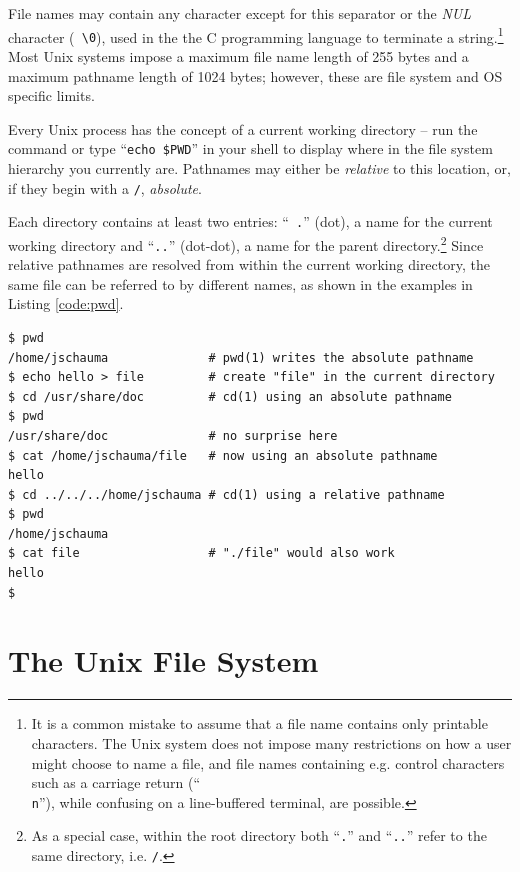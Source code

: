 File names may contain any character except for this
separator or the {\em NUL} character ({\tt
\textbackslash0}), used in the the C programming
language to terminate a string.\footnote{It is a
common mistake to assume that a file name contains
only printable characters.  The Unix system does not
impose many restrictions on how a user might choose
to name a file, and file names containing e.g. control
characters such as a carriage return (``{\tt \\n}''),
while confusing on a line-buffered terminal, are
possible.}  Most Unix systems impose a maximum file
name length of 255 bytes and a maximum pathname length
of 1024 bytes; however, these are file system and OS
specific limits.

Every Unix process has the concept of a current
working directory -- run the  command
or type ``{\tt echo \$PWD}'' in your shell to display
where in the file system hierarchy you currently are.
Pathnames may either be {\em relative} to this
location, or, if they begin with a {\tt /}, {\em
absolute}.

Each directory contains at least two entries: ``{\tt
.}'' (dot), a name for the current working directory
and ``{\tt ..}'' (dot-dot), a name for the parent
directory.\footnote{As a special case, within the root
directory both ``{\tt .}'' and ``{\tt ..}'' refer to
the same directory, i.e. {\tt /}.}  Since relative
pathnames are resolved from within the current working
directory, the same file can be referred to by
different names, as shown in the examples in Listing
\ref{code:pwd}.

\begin{lstlisting}[float,basicstyle=\scriptsize,label=code:pwd,caption={[Absolute
and relative pathnames] Absolute pathnames begin with
a {\tt /} and are resolved from the root of the file
system; relative pathnames are resolved from the
current working directory.}]
$ pwd
/home/jschauma              # pwd(1) writes the absolute pathname
$ echo hello > file         # create "file" in the current directory
$ cd /usr/share/doc         # cd(1) using an absolute pathname
$ pwd
/usr/share/doc              # no surprise here
$ cat /home/jschauma/file   # now using an absolute pathname
hello
$ cd ../../../home/jschauma # cd(1) using a relative pathname
$ pwd
/home/jschauma
$ cat file                  # "./file" would also work
hello
$ 
\end{lstlisting}

\section{The Unix File System}
\label{sec:unix-file-system}

